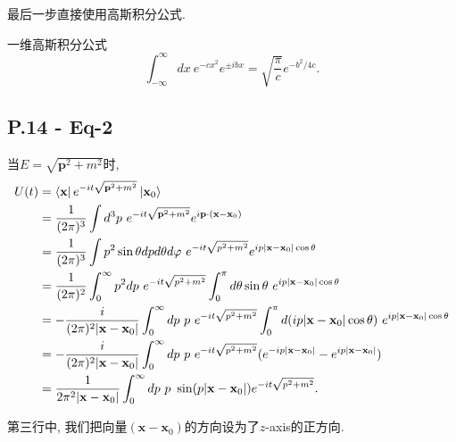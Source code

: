 最后一步直接使用高斯积分公式.

\begin{mybox}{一维高斯积分公式}
  \begin{equation}
    \int_{-\infty}^{\infty}dx\ e^{-cx^2}e^{\pm ibx} = \sqrt{\frac{\pi}{c}}e^{-b^2/4c}.
  \end{equation}
\end{mybox}

\subsection{P.14 - Eq-2}

当$E = \sqrt{\mathbf{p}^2+m^2}$时,
\begin{equation}
  \begin{aligned}
    U(t) & = \mathinner{\langle \mathbf{x}|}e^{-it\sqrt{\mathbf{p}^2+m^2}}\mathinner{|\mathbf{x}_0\rangle}                                                                                            \\
         & = \frac{1}{(2\pi)^3} \int d^3p \ e^{-it\sqrt{\mathbf{p}^2+m^2}} e^{i\mathbf{p}\cdot(\mathbf{x}-\mathbf{x}_0)}                                                                              \\
         & = \frac{1}{(2\pi)^3} \int p^2\sin\theta dp d\theta d\varphi \ e^{-it\sqrt{p^2+m^2}} e^{ip|\mathbf{x}-\mathbf{x}_0|\cos\theta}                                                              \\
         & = \frac{1}{(2\pi)^2} \int_0^\infty p^2 dp \ e^{-it\sqrt{p^2+m^2}} \int_0^\pi d\theta \sin\theta \ e^{ip|\mathbf{x}-\mathbf{x}_0|\cos\theta}                                                \\
         & = -\frac{i}{(2\pi)^2|\mathbf{x}-\mathbf{x}_0|} \int_0^\infty dp \ p\ e^{-it\sqrt{p^2+m^2}} \int_0^\pi d(ip|\mathbf{x}-\mathbf{x}_0|\cos\theta) \ e^{ip|\mathbf{x}-\mathbf{x}_0|\cos\theta} \\
         & = -\frac{i}{(2\pi)^2|\mathbf{x}-\mathbf{x}_0|} \int_0^\infty dp \ p\ e^{-it\sqrt{p^2+m^2}} (e^{-ip|\mathbf{x}-\mathbf{x}_0|}-e^{ip|\mathbf{x}-\mathbf{x}_0|})                              \\
         & = \frac{1}{2\pi^2|\mathbf{x}-\mathbf{x}_0|} \int_0^\infty dp \ p\ \sin(p|\mathbf{x}-\mathbf{x}_0|) e^{-it\sqrt{p^2+m^2}}.
  \end{aligned}
\end{equation}

第三行中, 我们把向量$(\mathbf{x}-\mathbf{x}_0)$的方向设为了$z$-axis的正方向.

